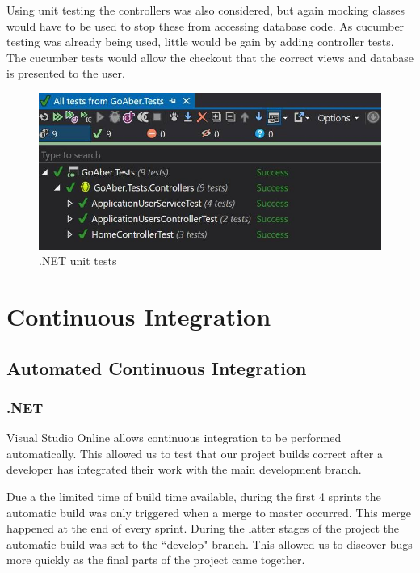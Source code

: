 Using unit testing the controllers was also considered, but again mocking classes would have to be used to stop these from accessing database code. As cucumber testing was already being used, little would be gain by adding controller tests. The cucumber tests would allow the checkout that the correct views and database is presented to the user.

\begin{figure}[H]
\begin{center}
\includegraphics[scale=0.3]{images/testing/unitTestsNET.jpg} 
\caption{.NET unit tests}
\label{fig:testing_unitTestNET}
\end{center}
\end{figure}

\section{Continuous Integration}

\subsection{Automated Continuous Integration}
\subsubsection{.NET}

Visual Studio Online allows continuous integration to be performed automatically. This allowed us to test that our project builds correct after a developer has integrated their work with the main development branch.

Due a the limited time of build time available, during the first 4 sprints the automatic build was only triggered when a merge to master occurred. This merge happened at the end of every sprint. During the latter stages of the project the automatic build was set to the ``develop" branch. This allowed us to discover bugs more quickly as the final parts of the project came together.

